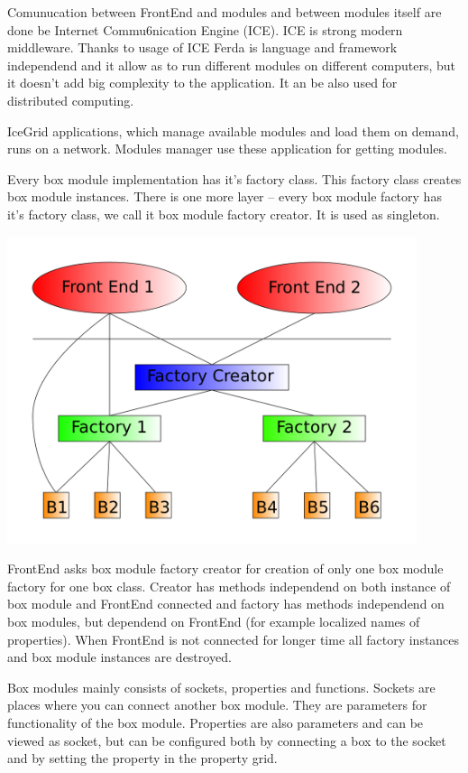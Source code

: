 \documentclass{article}
\begin{document}
Comunucation between FrontEnd and modules and between modules itself are done be Internet Commu6nication Engine (ICE). ICE is strong modern middleware. Thanks to usage of ICE Ferda is language and framework independend and it allow as to run different modules on different computers, but it doesn't add big complexity to the application. It an be also used for distributed computing.

IceGrid applications, which manage available modules and load them on demand, runs on a network. Modules manager use these application for getting modules.

Every box module implementation has it's factory class. This factory class creates box module instances. There is one more layer -- every box module factory has it's factory class, we call it box module factory creator. It is used as singleton.

\noindent\includegraphics[width=12cm]{creatorFactory}

FrontEnd asks box module factory creator for creation of only one box module factory for one box class. Creator has methods independend on both instance of box module and FrontEnd connected and factory has methods independend on box modules, but dependend on FrontEnd (for example localized names of properties). When FrontEnd is not connected for longer time all factory instances and box module instances are destroyed.

Box modules mainly consists of sockets, properties and functions. Sockets are places where you can connect another box module. They are parameters for functionality of the box module. Properties are also parameters and can be viewed as socket, but can be configured both by connecting a box to the socket and by setting the property in the property grid.
\end{document}
